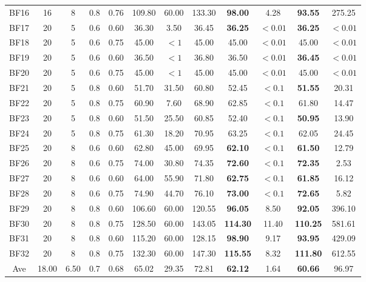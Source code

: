 \documentclass[review,3p,times,authoryear,12pt]{elsarticle}
\begin{document}
\begin{table}[htbp]
\begin{tabular}{c|c|c|c|c|c|c|c|c|c|c|c}
    BF16  & 16    & 8     & 0.8   & 0.76  & 109.80 & 60.00 & 133.30 & \textbf{98.00 } & 4.28    & \textbf{93.55}  & 275.25  \\
    BF17  & 20    & 5     & 0.6   & 0.60  & 36.30  & 3.50  & 36.45  & \textbf{36.25 } & $<0.01$ & \textbf{36.25}  & $<0.01$ \\
    BF18  & 20    & 5     & 0.6   & 0.75  & 45.00  & $<1$  & 45.00  & 45.00  & $<0.01$ & 45.00  & $<0.01$ \\
    BF19  & 20    & 5     & 0.6   & 0.60  & 36.50  & $<1$  & 36.80  & 36.50  & $<0.01$ & \textbf{36.45}  & $<0.01$ \\
    BF20  & 20    & 5     & 0.6   & 0.75  & 45.00  & $<1$  & 45.00  & 45.00  & $<0.01$ & 45.00  & $<0.01$ \\
    BF21  & 20    & 5     & 0.8   & 0.60  & 51.70  & 31.50 & 60.80  & 52.45  & $<0.1$  & \textbf{51.55}  & 20.31  \\
    BF22  & 20    & 5     & 0.8   & 0.75  & 60.90  & 7.60  & 68.90  & 62.85  & $<0.1$  & 61.80  & 14.47  \\
    BF23  & 20    & 5     & 0.8   & 0.60  & 51.50  & 25.50 & 60.85  & 52.40  & $<0.1$  & \textbf{50.95}  & 13.90  \\
    BF24  & 20    & 5     & 0.8   & 0.75  & 61.30  & 18.20 & 70.95  & 63.25  & $<0.1$  & 62.05  & 24.45  \\
    BF25  & 20    & 8     & 0.6   & 0.60  & 62.80  & 45.00 & 69.95  & \textbf{62.10 } & $<0.1$  & \textbf{61.50}  & 12.79  \\
    BF26  & 20    & 8     & 0.6   & 0.75  & 74.00  & 30.80 & 74.35  & \textbf{72.60 } & $<0.1$  & \textbf{72.35}  & 2.53  \\
    BF27  & 20    & 8     & 0.6   & 0.60  & 64.00  & 55.90 & 71.80  & \textbf{62.75 } & $<0.1$  & \textbf{61.85}  & 16.12  \\
    BF28  & 20    & 8     & 0.6   & 0.75  & 74.90  & 44.70 & 76.10  & \textbf{73.00 } & $<0.1$  & \textbf{72.65}  & 5.82  \\
    BF29  & 20    & 8     & 0.8   & 0.60  & 106.60 & 60.00 & 120.55 & \textbf{96.05}  & 8.50    & \textbf{92.05}  & 396.10  \\
    BF30  & 20    & 8     & 0.8   & 0.75  & 128.50 & 60.00 & 143.05 &\textbf{ 114.30} & 11.40   & \textbf{110.25} & 581.61  \\
    BF31  & 20    & 8     & 0.8   & 0.60  & 115.20 & 60.00 & 128.15 & \textbf{98.90}  & 9.17    & \textbf{93.95}  & 429.09  \\
    BF32  & 20    & 8     & 0.8   & 0.75  & 132.30 & 60.00 & 147.30 & \textbf{115.55} & 8.32    & \textbf{111.80} & 612.55  \\
    \hline
    Ave   & 18.00 & 6.50  & 0.7   & 0.68  & 65.02  & 29.35 & 72.81  & \textbf{62.12}  & 1.64    & \textbf{60.66}  & 96.97  \\
   \hline
\end{tabular}
\end{table}
\end{document}
